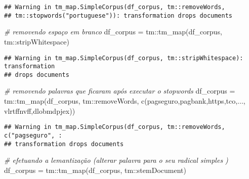 \documentclass[
]{article}
\newenvironment{Shaded}{\begin{snugshade}}{\end{snugshade}}
\newcommand{\CommentTok}[1]{\textcolor[rgb]{0.56,0.35,0.01}{\textit{#1}}}
\newcommand{\FunctionTok}[1]{\textcolor[rgb]{0.00,0.00,0.00}{#1}}
\newcommand{\NormalTok}[1]{#1}
\newcommand{\OtherTok}[1]{\textcolor[rgb]{0.56,0.35,0.01}{#1}}
\newcommand{\SpecialCharTok}[1]{\textcolor[rgb]{0.00,0.00,0.00}{#1}}
\newcommand{\StringTok}[1]{\textcolor[rgb]{0.31,0.60,0.02}{#1}}
\begin{document}
\begin{verbatim}
## Warning in tm_map.SimpleCorpus(df_corpus, tm::removeWords,
## tm::stopwords("portuguese")): transformation drops documents
\end{verbatim}

\begin{Shaded}
\begin{Highlighting}[]
\CommentTok{\# removendo espaço em branco}
\NormalTok{df\_corpus }\OtherTok{=}\NormalTok{ tm}\SpecialCharTok{::}\FunctionTok{tm\_map}\NormalTok{(df\_corpus, tm}\SpecialCharTok{::}\NormalTok{stripWhitespace)}
\end{Highlighting}
\end{Shaded}

\begin{verbatim}
## Warning in tm_map.SimpleCorpus(df_corpus, tm::stripWhitespace): transformation
## drops documents
\end{verbatim}

\begin{Shaded}
\begin{Highlighting}[]
\CommentTok{\# removendo palavras que ficaram após executar o stopwords}
\NormalTok{df\_corpus }\OtherTok{=}\NormalTok{ tm}\SpecialCharTok{::}\FunctionTok{tm\_map}\NormalTok{(df\_corpus, tm}\SpecialCharTok{::}\NormalTok{removeWords, }\FunctionTok{c}\NormalTok{(}\StringTok{\textquotesingle{}pagseguro\textquotesingle{}}\NormalTok{,}\StringTok{\textquotesingle{}pagbank\textquotesingle{}}\NormalTok{,}\StringTok{\textquotesingle{}https\textquotesingle{}}\NormalTok{,}\StringTok{\textquotesingle{}tco\textquotesingle{}}\NormalTok{,}\StringTok{\textquotesingle{}...\textquotesingle{}}\NormalTok{, }\StringTok{\textquotesingle{}vlrtffnvff\textquotesingle{}}\NormalTok{,}\StringTok{\textquotesingle{}dlobmdpjex\textquotesingle{}}\NormalTok{))}
\end{Highlighting}
\end{Shaded}

\begin{verbatim}
## Warning in tm_map.SimpleCorpus(df_corpus, tm::removeWords, c("pagseguro", :
## transformation drops documents
\end{verbatim}

\begin{Shaded}
\begin{Highlighting}[]
\CommentTok{\# efetuando a lemantização (alterar palavra para o seu radical simples )}
\NormalTok{df\_corpus }\OtherTok{=}\NormalTok{ tm}\SpecialCharTok{::}\FunctionTok{tm\_map}\NormalTok{(df\_corpus, tm}\SpecialCharTok{::}\NormalTok{stemDocument)}
\end{Highlighting}
\end{Shaded}
\end{document}
